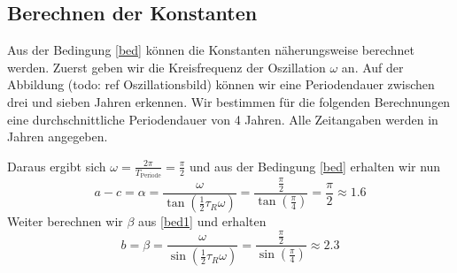 \subsection{Berechnen der Konstanten}
Aus der Bedingung \eqref{bed} können die Konstanten näherungsweise berechnet werden.
Zuerst geben wir die Kreisfrequenz der Oszillation $\omega$ an. 
Auf der Abbildung (todo: ref Oszillationsbild) können wir eine Periodendauer zwischen drei und sieben Jahren erkennen.
Wir bestimmen für die folgenden Berechnungen eine durchschnittliche Periodendauer von 4 Jahren. 
Alle Zeitangaben werden in Jahren angegeben.

Daraus ergibt sich $\omega = \frac{2\pi}{T_\text{Periode}} = \frac{\pi}{2}$ und aus der Bedingung \eqref{bed} erhalten wir nun 
\begin{equation}
	a-c=\alpha=\frac{\omega}{\tan(\frac{1}{2}\tau_R \omega)}=\frac{\frac{\pi}{2}}{\tan(\frac{\pi}{4})}=\frac{\pi}{2}\approx 1.6
\end{equation}
Weiter berechnen wir $\beta$ aus \eqref{bed1} und erhalten
\begin{equation}
	b=\beta=\frac{\omega}{\sin(\frac{1}{2}\tau_R \omega)}=\frac{\frac{\pi}{2}}{\sin(\frac{\pi}{4})}\approx 2.3
\end{equation}

